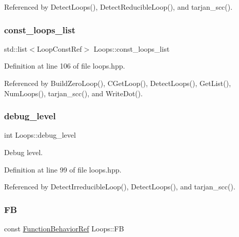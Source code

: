 Referenced by Detect\+Loops(), Detect\+Reducible\+Loop(), and tarjan\+\_\+scc().

\mbox{\label{classLoops_a315b5cb886eb68b60ba20a0e85de97cf}} 
\subsubsection{\texorpdfstring{const\+\_\+loops\+\_\+list}{const\_loops\_list}}
{\footnotesize\ttfamily std\+::list$<$Loop\+Const\+Ref$>$ Loops\+::const\+\_\+loops\+\_\+list\hspace{0.3cm}{\ttfamily [private]}}



Definition at line 106 of file loops.\+hpp.



Referenced by Build\+Zero\+Loop(), C\+Get\+Loop(), Detect\+Loops(), Get\+List(), Num\+Loops(), tarjan\+\_\+scc(), and Write\+Dot().

\mbox{\label{classLoops_aa40adf704306582fde6278a4257d1efa}} 
\subsubsection{\texorpdfstring{debug\+\_\+level}{debug\_level}}
{\footnotesize\ttfamily int Loops\+::debug\+\_\+level\hspace{0.3cm}{\ttfamily [private]}}



Debug level. 



Definition at line 99 of file loops.\+hpp.



Referenced by Detect\+Irreducible\+Loop(), Detect\+Loops(), and tarjan\+\_\+scc().

\mbox{\label{classLoops_ab337d3197422c62eabab4566280e95df}} 
\subsubsection{\texorpdfstring{FB}{FB}}
{\footnotesize\ttfamily const \hyperlink{function__behavior_8hpp_affbc6a46ab86ddfabe31c10986d333dc}{Function\+Behavior\+Ref} Loops\+::\+FB\hspace{0.3cm}{\ttfamily [private]}}



